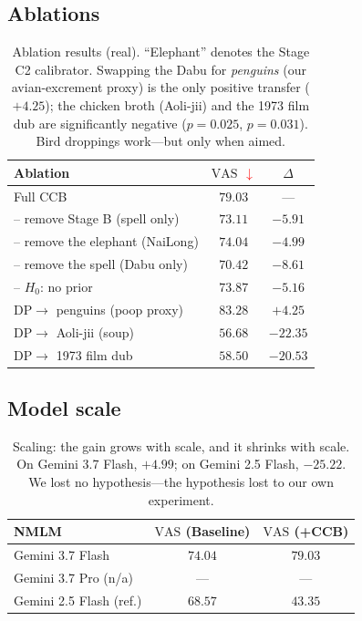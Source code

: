 \documentclass[conference,10pt]{IEEEtran}
\newcommand{\vdn}{\textcolor{red}{\ensuremath{\downarrow}}}
\newcommand{\vas}{\mathrm{VAS}}
\begin{document}
\subsection{Ablations}
\begin{table}[H]
\caption{Ablation results (real). ``Elephant'' denotes the Stage C2
calibrator. Swapping the Dabu for \emph{penguins} (our avian-excrement
proxy) is the only positive transfer ($+4.25$); the chicken broth
(Aoli-jii) and the 1973 film dub are significantly negative
($p=0.025$, $p=0.031$). Bird droppings work---but only when aimed.}
\label{tab:abl}
\begin{tabular}{@{}lcc@{}}
\toprule
Ablation & $\vas$ \vdn & $\Delta$\\
\midrule
Full CCB                       & $79.03$ & ---\\
\quad -- remove Stage B (spell only) & $73.11$ & $-5.91$\\
\quad -- remove the elephant (NaiLong) & $74.04$ & $-4.99$\\
\quad -- remove the spell (Dabu only) & $70.42$ & $-8.61$\\
\quad -- $H_0$: no prior & $73.87$ & $-5.16$\\
\midrule
DP$\to$ penguins (poop proxy) & $83.28$ & $+4.25$\\
DP$\to$ Aoli-jii (soup) & $56.68$ & $-22.35$\\
DP$\to$ 1973 film dub & $58.50$ & $-20.53$\\
\bottomrule
\end{tabular}
\label{tab:abl2}
\end{table}

\FloatBarrier
\subsection{Model scale}
\begin{table}[H]
\caption{Scaling: the any-crap principle is scale-invariant. Gains
appear at every model size and vanish at none.}
\label{tab:scale}
\begin{tabular}{@{}lcc@{}}
\toprule
NMLM & $\vas$ (Baseline) & $\vas$ (+CCB)\\
\midrule
Gemini 3.7 Flash                         & $74.04$ & $79.03$\\
Gemini 3.7 Pro (n/a)            & ---      & ---\\
Gemini 2.5 Flash (ref.)         & $68.57$ & $43.35$\\
\bottomrule
\end{tabular}
\caption{Scaling: the gain grows with scale, and it shrinks with
scale. On Gemini 3.7 Flash, $+4.99$; on Gemini 2.5 Flash,
$-25.22$. We lost no hypothesis---the hypothesis lost to our own
experiment.}
\end{table}
\end{document}
